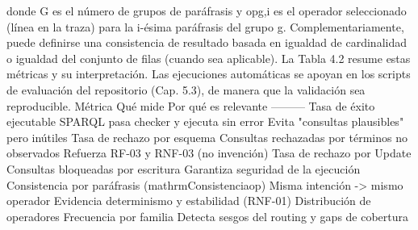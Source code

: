 {}donde \markdownRendererBackslash{}\markdownRendererDollarSign{}G\markdownRendererBackslash{}\markdownRendererDollarSign{} es el número de grupos de paráfrasis y \markdownRendererBackslash{}\markdownRendererDollarSign{}op\markdownRendererUnderscore{}\markdownRendererLeftBrace{}g,i\markdownRendererRightBrace{}\markdownRendererBackslash{}\markdownRendererDollarSign{} es el operador seleccionado (línea  en la traza) para la i-ésima paráfrasis del grupo \markdownRendererBackslash{}\markdownRendererDollarSign{}g\markdownRendererBackslash{}\markdownRendererDollarSign{}. Complementariamente, puede definirse una consistencia de resultado basada en igualdad de cardinalidad o igualdad del conjunto de filas (cuando sea aplicable).\markdownRendererInterblockSeparator
{}La Tabla 4.2 resume estas métricas y su interpretación. Las ejecuciones automáticas se apoyan en los scripts de evaluación del repositorio (Cap. 5.3), de manera que la validación sea reproducible.\markdownRendererInterblockSeparator
{}\markdownRendererInterblockSeparator
{}\markdownRendererPipe{} Métrica \markdownRendererPipe{} Qué mide \markdownRendererPipe{} Por qué es relevante \markdownRendererPipe{} \markdownRendererPipe{}---\markdownRendererPipe{}---\markdownRendererPipe{}---\markdownRendererPipe{} \markdownRendererPipe{} Tasa de éxito ejecutable \markdownRendererPipe{} SPARQL pasa checker y ejecuta sin error \markdownRendererPipe{} Evita "consultas plausibles" pero inútiles \markdownRendererPipe{} \markdownRendererPipe{} Tasa de rechazo por esquema \markdownRendererPipe{} Consultas rechazadas por términos no observados \markdownRendererPipe{} Refuerza RF-03 y RNF-03 (no invención) \markdownRendererPipe{} \markdownRendererPipe{} Tasa de rechazo por Update \markdownRendererPipe{} Consultas bloqueadas por escritura \markdownRendererPipe{} Garantiza seguridad de la ejecución \markdownRendererPipe{} \markdownRendererPipe{} Consistencia por paráfrasis (\markdownRendererBackslash{}\markdownRendererDollarSign{}\markdownRendererBackslash{}mathrm\markdownRendererLeftBrace{}Consistencia\markdownRendererRightBrace{}\markdownRendererUnderscore{}\markdownRendererLeftBrace{}op\markdownRendererRightBrace{}\markdownRendererBackslash{}\markdownRendererDollarSign{}) \markdownRendererPipe{} Misma intención -> mismo operador \markdownRendererPipe{} Evidencia determinismo y estabilidad (RNF-01) \markdownRendererPipe{} \markdownRendererPipe{} Distribución de operadores \markdownRendererPipe{} Frecuencia por familia \markdownRendererPipe{} Detecta sesgos del routing y gaps de cobertura \markdownRendererPipe{}\markdownRendererInterblockSeparator
